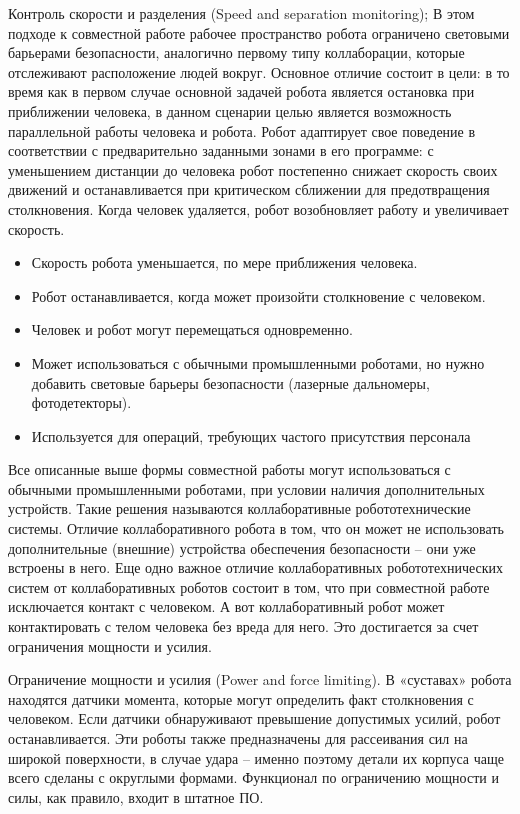 Контроль скорости и разделения (Speed and separation monitoring);
В этом подходе к совместной работе рабочее пространство робота ограничено световыми барьерами безопасности, аналогично первому типу коллаборации, которые отслеживают расположение людей вокруг. Основное отличие состоит в цели: в то время как в первом случае основной задачей робота является остановка при приближении человека, в данном сценарии целью является возможность параллельной работы человека и робота. Робот адаптирует свое поведение в соответствии с предварительно заданными зонами в его программе: с уменьшением дистанции до человека робот постепенно снижает скорость своих движений и останавливается при критическом сближении для предотвращения столкновения. Когда человек удаляется, робот возобновляет работу и увеличивает скорость.
\begin{itemize}
	\item Скорость робота уменьшается, по мере приближения человека.
	\item Робот останавливается, когда может произойти столкновение с человеком.
	\item Человек и робот могут перемещаться одновременно.
	\item Может использоваться с обычными промышленными роботами, но нужно добавить световые барьеры безопасности (лазерные дальномеры, фотодетекторы).
	\item Используется для операций, требующих частого присутствия персонала
\end{itemize}

Все описанные выше формы совместной работы могут использоваться с обычными промышленными роботами, при условии наличия дополнительных устройств. Такие решения называются коллаборативные робототехнические системы. Отличие коллаборативного робота в том, что он может не использовать дополнительные (внешние) устройства обеспечения безопасности – они уже встроены в него. Еще одно важное отличие коллаборативных робототехнических систем от коллаборативных роботов состоит в том, что при совместной работе исключается контакт с человеком. А вот коллаборативный робот может контактировать с телом человека без вреда для него. Это достигается за счет ограничения мощности и усилия.

Ограничение мощности и усилия (Power and force limiting). В «суставах» робота находятся датчики момента, которые могут определить факт столкновения с человеком. Если датчики обнаруживают превышение допустимых усилий, робот останавливается. Эти роботы также предназначены для рассеивания сил на широкой поверхности, в случае удара – именно поэтому детали их корпуса чаще всего сделаны с округлыми формами. Функционал по ограничению мощности и силы, как правило, входит в штатное ПО.


